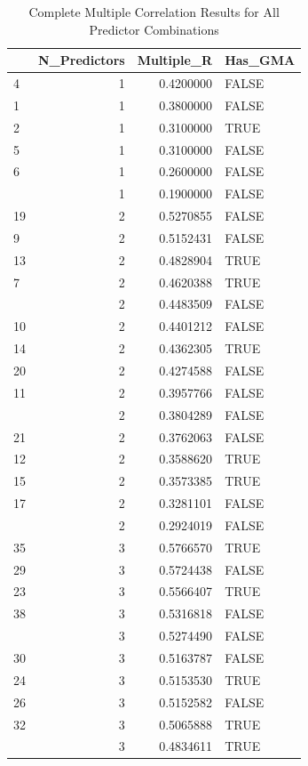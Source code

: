 \documentclass[
]{article}
\begin{document}
\begingroup\fontsize{8}{10}\selectfont

\begin{longtable}[t]{lrrl}
\caption{\label{tab:appendix-results}Complete Multiple Correlation Results for All Predictor Combinations}\\
\toprule
 & N\_Predictors & Multiple\_R & Has\_GMA\\
\midrule
4 & 1 & 0.4200000 & FALSE\\
1 & 1 & 0.3800000 & FALSE\\
2 & 1 & 0.3100000 & TRUE\\
5 & 1 & 0.3100000 & FALSE\\
6 & 1 & 0.2600000 & FALSE\\
\addlinespace
3 & 1 & 0.1900000 & FALSE\\
19 & 2 & 0.5270855 & FALSE\\
9 & 2 & 0.5152431 & FALSE\\
13 & 2 & 0.4828904 & TRUE\\
7 & 2 & 0.4620388 & TRUE\\
\addlinespace
16 & 2 & 0.4483509 & FALSE\\
10 & 2 & 0.4401212 & FALSE\\
14 & 2 & 0.4362305 & TRUE\\
20 & 2 & 0.4274588 & FALSE\\
11 & 2 & 0.3957766 & FALSE\\
\addlinespace
8 & 2 & 0.3804289 & FALSE\\
21 & 2 & 0.3762063 & FALSE\\
12 & 2 & 0.3588620 & TRUE\\
15 & 2 & 0.3573385 & TRUE\\
17 & 2 & 0.3281101 & FALSE\\
\addlinespace
18 & 2 & 0.2924019 & FALSE\\
35 & 3 & 0.5766570 & TRUE\\
29 & 3 & 0.5724438 & FALSE\\
23 & 3 & 0.5566407 & TRUE\\
38 & 3 & 0.5316818 & FALSE\\
\addlinespace
41 & 3 & 0.5274490 & FALSE\\
30 & 3 & 0.5163787 & FALSE\\
24 & 3 & 0.5153530 & TRUE\\
26 & 3 & 0.5152582 & FALSE\\
32 & 3 & 0.5065888 & TRUE\\
\addlinespace
36 & 3 & 0.4834611 & TRUE\\

\end{longtable}
\end{document}
